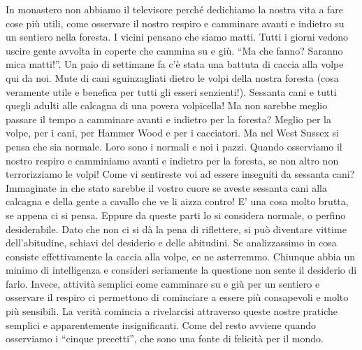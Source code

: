 In monastero non abbiamo il televisore perché dedichiamo la nostra vita
a fare cose più utili, come osservare il nostro respiro e camminare
avanti e indietro su un sentiero nella foresta. I vicini pensano che
siamo matti. Tutti i giorni vedono uscire gente avvolta in coperte che
cammina su e giù. ``Ma che fanno? Saranno mica matti!''. Un paio di
settimane fa c'è stata una battuta di caccia alla volpe qui da noi. Mute
di cani sguinzagliati dietro le volpi della nostra foresta (cosa
veramente utile e benefica per tutti gli esseri senzienti!). Sessanta
cani e tutti quegli adulti alle calcagna di una povera volpicella! Ma
non sarebbe meglio passare il tempo a camminare avanti e indietro per la
foresta? Meglio per la volpe, per i cani, per Hammer Wood e per i
cacciatori. Ma nel West Sussex si pensa che sia normale. Loro sono i
normali e noi i pazzi. Quando osserviamo il nostro respiro e camminiamo
avanti e indietro per la foresta, se non altro non terrorizziamo le
volpi! Come vi sentireste voi ad essere inseguiti da sessanta cani?
Immaginate in che stato sarebbe il vostro cuore se aveste sessanta cani
alla calcagna e della gente a cavallo che ve li aizza contro! E' una
cosa molto brutta, se appena ci si pensa. Eppure da queste parti lo si
considera normale, o perfino desiderabile. Dato che non ci si dà la pena
di riflettere, si può diventare vittime dell'abitudine, schiavi del
desiderio e delle abitudini. Se analizzassimo in cosa consiste
effettivamente la caccia alla volpe, ce ne asterremmo. Chiunque abbia un
minimo di intelligenza e consideri seriamente la questione non sente il
desiderio di farlo. Invece, attività semplici come camminare su e giù
per un sentiero e osservare il respiro ci permettono di cominciare a
essere più consapevoli e molto più sensibili. La verità comincia a
rivelarcisi attraverso queste nostre pratiche semplici e apparentemente
insignificanti. Come del resto avviene quando osserviamo i ``cinque
precetti'', che sono una fonte di felicità per il mondo.

